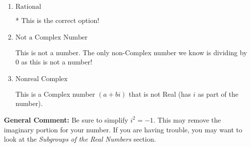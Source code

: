 \documentclass{extbook}[14pt]
\begin{document}
\begin{enumerate}
{\begin{enumerate}[label=\Alph*.]
This is a Complex number $(a+bi)$ that \textbf{only} has an imaginary part like $2i$.
\item \( \text{Rational} \)

* This is the correct option!
\item \( \text{Not a Complex Number} \)

This is not a number. The only non-Complex number we know is dividing by 0 as this is not a number!
\item \( \text{Nonreal Complex} \)

This is a Complex number $(a+bi)$ that is not Real (has $i$ as part of the number).
\end{enumerate}

\textbf{General Comment:} Be sure to simplify $i^2 = -1$. This may remove the imaginary portion for your number. If you are having trouble, you may want to look at the \textit{Subgroups of the Real Numbers} section.
}
\end{enumerate}
\end{document}
